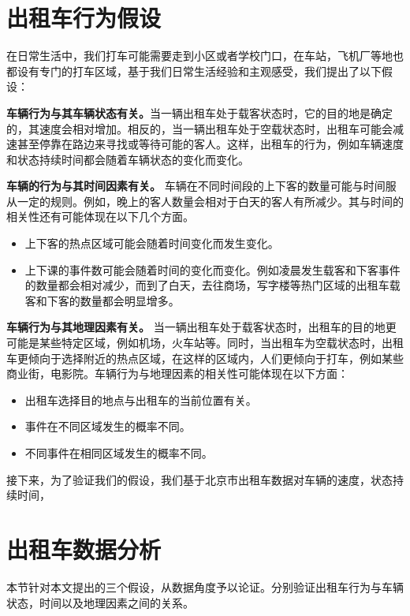 \section{出租车行为假设}

在日常生活中，我们打车可能需要走到小区或者学校门口，在车站，飞机厂等地也都设有专门的打车区域，基于我们日常生活经验和主观感受，我们提出了以下假设：
\begin{assumption}\label{assuption_1}
\textbf{车辆行为与其车辆状态有关。}当一辆出租车处于载客状态时，它的目的地是确定的，其速度会相对增加。相反的，当一辆出租车处于空载状态时，出租车可能会减速甚至停靠在路边来寻找或等待可能的客人。这样，出租车的行为，例如车辆速度和状态持续时间都会随着车辆状态的变化而变化。
\end{assumption}
\begin{assumption}\label{assuption_2}
\textbf{车辆的行为与其时间因素有关。}
车辆在不同时间段的上下客的数量可能与时间服从一定的规则。例如，晚上的客人数量会相对于白天的客人有所减少。其与时间的相关性还有可能体现在以下几个方面。
\begin{itemize}
\item 上下客的热点区域可能会随着时间变化而发生变化。
\item 上下课的事件数可能会随着时间的变化而变化。例如凌晨发生载客和下客事件的数量都会相对减少，而到了白天，去往商场，写字楼等热门区域的出租车载客和下客的数量都会明显增多。
\end{itemize}
\end{assumption}
\begin{assumption}\label{assuption_3}
\textbf{车辆行为与其地理因素有关。}
当一辆出租车处于载客状态时，出租车的目的地更可能是某些特定区域，例如机场，火车站等。同时，当出租车为空载状态时，出租车更倾向于选择附近的热点区域，在这样的区域内，人们更倾向于打车，例如某些商业街，电影院。车辆行为与地理因素的相关性可能体现在以下方面：
\begin{itemize}
\item 出租车选择目的地点与出租车的当前位置有关。
\item 事件在不同区域发生的概率不同。
\item 不同事件在相同区域发生的概率不同。
\end{itemize}
\end{assumption}

接下来，为了验证我们的假设，我们基于北京市出租车数据对车辆的速度，状态持续时间，

\section{出租车数据分析}
本节针对本文提出的三个假设，从数据角度予以论证。分别验证出租车行为与车辆状态，时间以及地理因素之间的关系。

